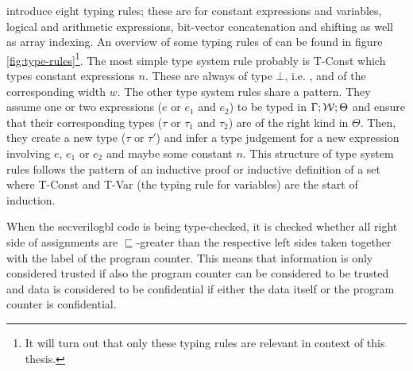 \citeauthor{Ferraiuolo17} introduce eight typing rules; these are for constant expressions and variables, logical and arithmetic expressions, bit-vector concatenation and shifting as well as array indexing.
An overview of some typing rules of \cite{Ferraiuolo17} can be found in figure \ref{fig:type-rules}\footnote{%
    It will turn out that only these typing rules are relevant in context of this thesis.
}.
The most simple type system rule probably is T-Const which types constant expressions $ n $.
These are always of type $ \bot $, i.e. \PT, and of the corresponding width $ w $.
The other type system rules share a pattern.
They assume one or two expressions ($ e $ or $ e_1 $ and $ e_2 $) to be typed in $ \Gamma; \mathcal{W}; \Theta $ and ensure that their corresponding types ($ \tau $ or $ \tau_1 $ and $ \tau_2 $) are of the right kind in $ \Theta $.
Then, they create a new type ($ \tau $ or $ \tau' $) and infer a type judgement for a new expression involving $ e $, $ e_1 $ or $ e_2 $ and maybe some constant $ n $.
This structure of type system rules follows the pattern of an inductive proof or inductive definition of a set where T-Const and T-Var (the typing rule for variables) are the start of induction.

When the \gls{secverilogbl} code is being type-checked, it is checked whether all right side of assignments are $ \sqsubseteq $-greater than the respective left sides taken together with the label of the program counter.
This means that information is only considered trusted if also the program counter can be considered to be trusted and data is considered to be confidential if either the data itself or the program counter is confidential.

